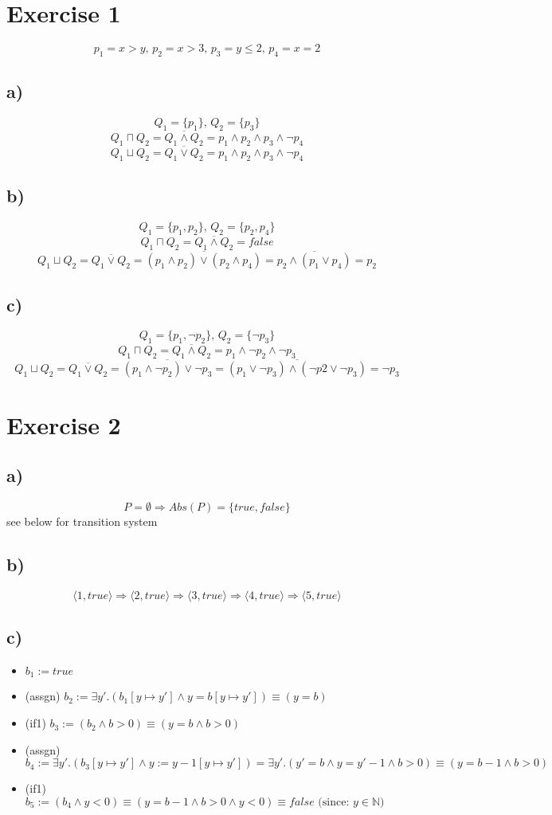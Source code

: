 \documentclass[fleqn,12pt]{article}
\begin{document}
\section*{Exercise 1}
$$p_1 = x>y \text{, }p_2 = x>3 \text{, }p_3 = y \leq 2 \text{, } p_4 = x = 2$$
\subsection*{a)}
$$Q_1 = \{p_1\}\text{, } Q_2 =  \{p_3\}$$
$$Q_1 \sqcap Q_2 = \overline{Q_1 \wedge Q_2} = p_1 \wedge p_2 \wedge p_3 \wedge \lnot p_4$$
$$Q_1 \sqcup Q_2 = \overline{Q_1 \vee Q_2} = p_1 \wedge p_2 \wedge p_3 \wedge \lnot p_4$$
\subsection*{b)}
$$Q_1 = \{p_1,p_2\}\text{, } Q_2 =  \{p_2,p_4\}$$
$$Q_1 \sqcap Q_2 = \overline{Q_1 \wedge Q_2} = false$$
$$Q_1 \sqcup Q_2 = \overline{Q_1 \vee Q_2} = \overline{(p_1 \wedge p_2) \vee (p_2 \wedge p_4)} = \overline{p_2 \wedge (p_1 \vee p_4)} = p_2$$
\subsection*{c)}
$$Q_1 = \{p_1,\lnot p_2\}\text{, } Q_2 =  \{\lnot p_3\}$$
$$Q_1 \sqcap Q_2 = \overline{Q_1 \wedge Q_2} = p_1 \wedge \lnot p_2 \wedge \lnot p_3$$
$$Q_1 \sqcup Q_2 = \overline{Q_1 \vee Q_2} = \overline{(p_1 \wedge \lnot p_2) \vee \lnot p_3} = \overline{(p_1 \vee \lnot p_3) \wedge (\lnot p2 \vee \lnot p_3)} = \lnot p_3$$
\section*{Exercise 2}

\subsection*{a)}
$$P=\emptyset \Rightarrow Abs(P) = \{true,false\}$$
see below for transition system
\subsection*{b)}
$$\langle 1, true \rangle \Rightarrow \langle 2, true \rangle \Rightarrow \langle 3, true \rangle \Rightarrow \langle 4, true \rangle \Rightarrow \langle 5, true \rangle$$
\subsection*{c)}
\begin{itemize}
\item $b_1 := true$
\item (assgn) $b_2 := \exists y'.(b_1[y\mapsto y'] \wedge y=b[y \mapsto y']) \equiv (y=b) $
\item (if1) $b_3 := (b_2 \wedge b > 0) \equiv (y=b \wedge b>0)$
\item (assgn) $b_4 := \exists y'. (b_3[y \mapsto y'] \wedge y := y -1 [y \mapsto y']) =  \exists y'. (y'=b \wedge y = y' - 1 \wedge b>0) \equiv (y=b - 1 \wedge b>0)$
\item (if1) $b_5 := (b_4 \wedge y < 0) \equiv (y=b-1 \wedge b>0 \wedge y<0) \equiv false \text{ (since: }y \in \mathbb{N})$
\end{itemize}
\end{document}
